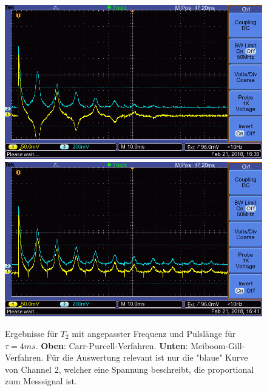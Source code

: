 \documentclass[12pt,a4paper]{article}
\begin{document}
\begin{figure}
\centering
\includegraphics[scale=0.8]{Bilder/T2CPalt.png}
\includegraphics[scale=0.8]{Bilder/T2MGalt.png}
\caption{Ergebnisse für $T_2$ mit angepasster Frequenz und Pulslänge für $\tau = 4ms$. \textbf{Oben}: Carr-Purcell-Verfahren. \textbf{Unten}: Meiboom-Gill-Verfahren. Für die Auswertung relevant ist nur die "blaue" Kurve von Channel 2, welcher eine Spannung beschreibt, die proportional zum Messsignal ist.}
\label{fig:T2Datenalt}
\end{figure}
\end{document}

